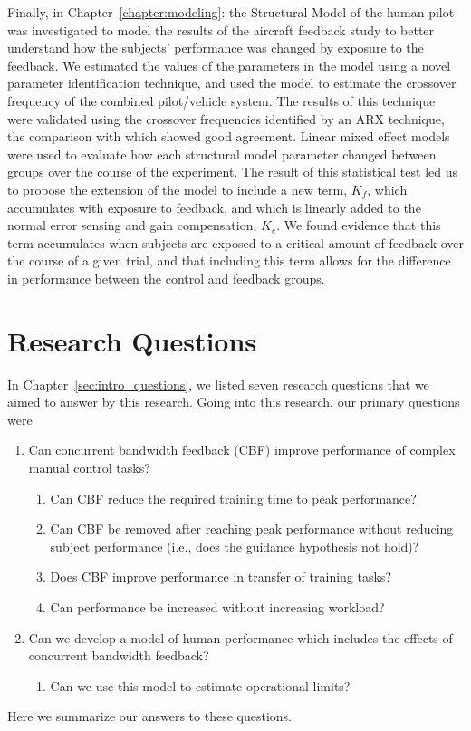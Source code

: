 Finally, in Chapter~\ref{chapter:modeling}:  the Structural Model of the human pilot was investigated to model the results of the aircraft feedback study to better understand how the subjects' performance was changed by exposure to the feedback.
We estimated the values of the parameters in the model using a novel parameter identification technique, and used the model to estimate the crossover frequency of the combined pilot/vehicle system.
The results of this technique were validated using the crossover frequencies identified by an ARX technique, the comparison with which showed good agreement.
Linear mixed effect models were used to evaluate how each structural model parameter changed between groups over the course of the experiment.
The result of this statistical test led us to propose the extension of the model to include a new term, $K_f$, which accumulates with exposure to feedback, and which is linearly added to the normal error sensing and gain compensation, $K_e$.
We found evidence that this term accumulates when subjects are exposed to a critical amount of feedback over the course of a given trial, and that including this term allows for the difference in performance between the control and feedback groups.

\section{Research Questions}

In Chapter~\ref{sec:intro_questions}, we listed seven research questions that we aimed to answer by this research.
Going into this research, our primary questions were
\begin{enumerate}
    \item Can concurrent bandwidth feedback (CBF) improve performance of complex manual control tasks?
          \begin{enumerate}
              \item Can CBF reduce the required training time to peak performance?
              \item Can CBF be removed after reaching peak performance without reducing subject performance (i.e., does the guidance hypothesis not hold)?
              \item Does CBF improve performance in transfer of training tasks?
              \item Can performance be increased without increasing workload?
          \end{enumerate}
    \item Can we develop a model of human performance which includes the effects of concurrent bandwidth feedback?
          \begin{enumerate}
              \item Can we use this model to estimate operational limits?
          \end{enumerate}
\end{enumerate}
Here we summarize our answers to these questions.

